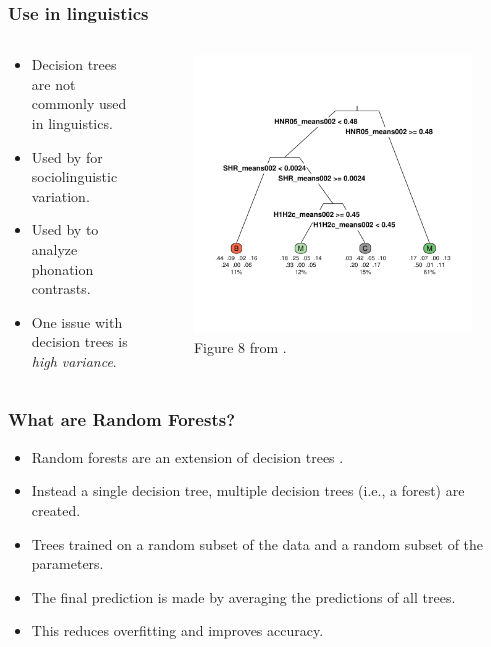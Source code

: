 \documentclass[professionalfonts]{beamer}
\begin{document}
\begin{frame}
  \frametitle{Use in linguistics}
  \begin{columns}
    \begin{column}{0.40\linewidth}
      \begin{itemize}
        \item Decision trees are not commonly used in linguistics.
        \item Used by \citet{tagliamonteModelsForestsTrees2012} for sociolinguistic variation.
        \item Used by \citet{keatingCrosslanguageAcousticSpace2023} to analyze phonation contrasts. 
        \item One issue with decision trees is \textit{high variance}.
      \end{itemize}
    \end{column}
    \begin{column}{0.67\linewidth}
      \begin{figure}
        \centering
        \includegraphics[width=.8\linewidth]{images/keating_tree.pdf}
        \caption{Figure 8 from \citet{keatingCrosslanguageAcousticSpace2023}.}
      \end{figure}
    \end{column}
  \end{columns}  
\end{frame}

\begin{frame}
  \frametitle{What are Random Forests?}
  \begin{itemize}
    \item Random forests are an extension of decision trees \citep{breimanRandomForests2001}.   
    \item Instead a single decision tree, multiple decision trees (i.e., a forest) are created.
    \item Trees trained on a random subset of the data and a random subset of the parameters.
    \item The final prediction is made by averaging the predictions of all trees.
    \item This reduces overfitting and improves accuracy.
  \end{itemize}
\end{frame}
\end{document}
